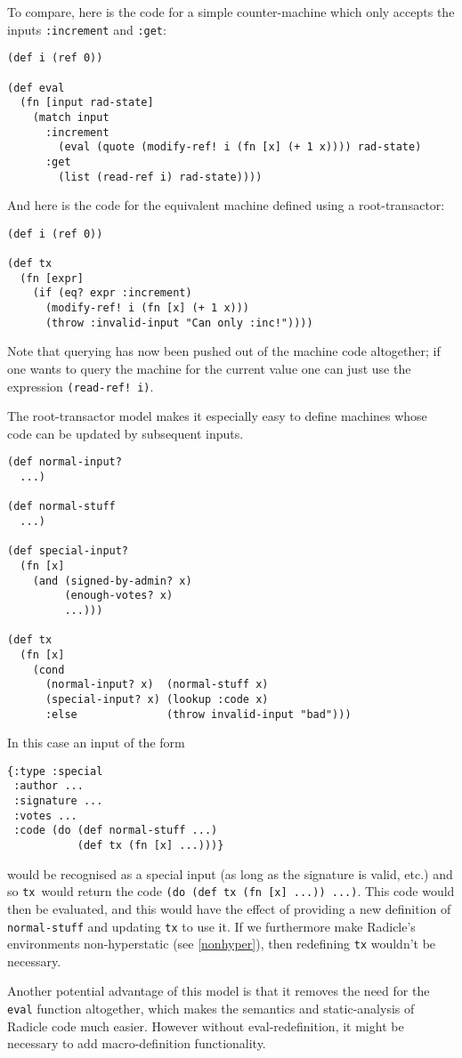 \documentclass[a4paper, oneside, 10pt]{amsart}
\def\tx{\texttt{tx}}
\begin{document}
To compare, here is the code for a simple counter-machine which only accepts the
inputs \texttt{:increment} and \texttt{:get}:
\begin{lstlisting}
(def i (ref 0))

(def eval
  (fn [input rad-state]
    (match input
      :increment
        (eval (quote (modify-ref! i (fn [x] (+ 1 x)))) rad-state)
      :get
        (list (read-ref i) rad-state))))
\end{lstlisting}
And here is the code for the equivalent machine defined using a root-transactor:
\begin{lstlisting}
(def i (ref 0))
  
(def tx
  (fn [expr]
    (if (eq? expr :increment)
      (modify-ref! i (fn [x] (+ 1 x)))
      (throw :invalid-input "Can only :inc!"))))
\end{lstlisting}

Note that querying has now been pushed out of the machine code altogether; if
one wants to query the machine for the current value one can just use the
expression \texttt{(read-ref! i)}.

The root-transactor model makes it especially easy to define machines whose code
can be updated by subsequent inputs.
\begin{lstlisting}
(def normal-input?
  ...)

(def normal-stuff
  ...)

(def special-input?
  (fn [x]
    (and (signed-by-admin? x)
         (enough-votes? x)
         ...)))

(def tx
  (fn [x]
    (cond
      (normal-input? x)  (normal-stuff x)
      (special-input? x) (lookup :code x)
      :else              (throw invalid-input "bad")))
\end{lstlisting}
In this case an input of the form
\begin{lstlisting}
{:type :special
 :author ...
 :signature ...
 :votes ...
 :code (do (def normal-stuff ...)
           (def tx (fn [x] ...)))}
\end{lstlisting}
would be recognised as a special input (as long as the signature is valid, etc.)
and so \tx~would return the code \texttt{(do (def tx (fn [x] ...)) ...)}. This
code would then be evaluated, and this would have the effect of providing a new
definition of \texttt{normal-stuff} and updating \texttt{tx} to use it. If we
furthermore make Radicle's environments non-hyperstatic (see \ref{nonhyper}),
then redefining \texttt{tx} wouldn't be necessary.

Another potential advantage of this model is that it removes the need for the
\texttt{eval} function altogether, which makes the semantics and static-analysis
of Radicle code much easier. However without eval-redefinition, it might be
necessary to add macro-definition functionality.
\end{document}
